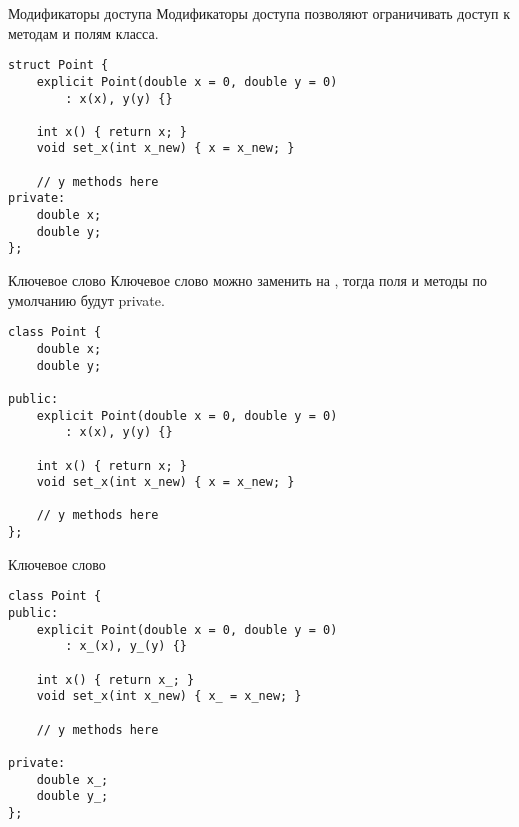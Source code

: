 \documentclass{beamer}
\begin{document}
\begin{frame}[fragile]{Модификаторы доступа}{}
    Модификаторы доступа позволяют ограничивать 
    доступ к методам и полям класса.
\begin{lstlisting}
struct Point {
    explicit Point(double x = 0, double y = 0) 
        : x(x), y(y) {}

    int x() { return x; }
    void set_x(int x_new) { x = x_new; }

    // y methods here
private:
    double x;
    double y;
};
\end{lstlisting}
\end{frame}

\begin{frame}[fragile]{Ключевое слово }{}
    Ключевое слово  можно заменить на 
    , тогда поля и методы
    по умолчанию будут private.

\begin{lstlisting}
class Point {
    double x;
    double y;

public:
    explicit Point(double x = 0, double y = 0) 
        : x(x), y(y) {}

    int x() { return x; }
    void set_x(int x_new) { x = x_new; }

    // y methods here
};
\end{lstlisting}
\end{frame}

\begin{frame}[fragile]{Ключевое слово }{}
\begin{lstlisting}
class Point {
public:
    explicit Point(double x = 0, double y = 0) 
        : x_(x), y_(y) {}

    int x() { return x_; }
    void set_x(int x_new) { x_ = x_new; }

    // y methods here

private:
    double x_;
    double y_;
};
\end{lstlisting}
\end{frame}
\end{document}
